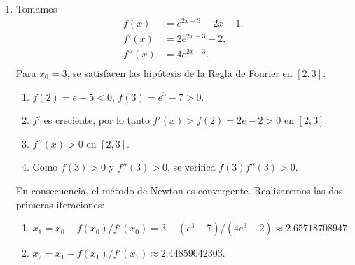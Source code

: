 \begin{EjerciciosResueltos}
\begin{solucion}
\begin{enumerate}
    \item Tomamos
      \begin{align*}
        f(x)&=e^{2x-3} -2x-1, \\
        f'(x)&=2e^{2x-3} -2, \\
        f''(x)&=4e^{2x-3}. \\
      \end{align*}
      Para $x_0=3$, se satisfacen las hipótesis de la Regla de
      Fourier en $[2,3]$:
      \begin{enumerate}
      \item $f(2)=e-5<0$, $f(3)=e^3-7>0$.
      \item $f'$ es creciente, por lo tanto $f'(x)>f(2)=2e-2>0$ en
        $[2,3]$.
      \item $f''(x)>0$ en $[2,3]$.
      \item Como $f(3)>0$ y $f''(3)>0$, se verifica $f(3)f''(3)>0$.
      \end{enumerate}
      En consecuencia, el método de Newton es convergente.
      Realizaremos las dos primeras iteraciones:
      \begin{enumerate}
      \item
        $x_1 = x_0 - f(x_0)/f'(x_0) = 3 - (e^3-7)/(4e^3-2) \approx
        2.65718708947.$
      \item $x_2 = x_1 - f(x_1)/f'(x_1) \approx 2.44859042303.$
      \end{enumerate}
    \end{enumerate}
  \end{solucion}
\end{EjerciciosResueltos}


